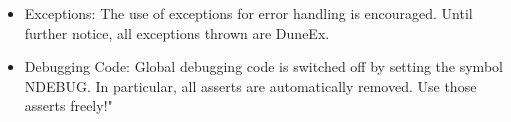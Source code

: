 \begin{itemize}
\begin{itemize}
\item Method Parameters
\item Template Parameters
\item Return Values
\item Exceptions thrown by a method
 \end{itemize}
     Since we all know that writing documentation is not well-liked and is frequently defered to some vague 
'next week', we herewith proclaim the Doc-Me Dogma . It goes like this: Whatever you do, and in whatever hurry you 
happen to be, please document everything at least with a {\verb /** $\backslash$todo Please doc me! */}. That way at least the absence 
of documentation is documented, and it is easier to get rid of it systematically.
\item Exceptions:
      The use of exceptions for error handling is encouraged. Until further notice, all exceptions thrown are DuneEx.
\item Debugging Code:
      Global debugging code is switched off by setting the symbol NDEBUG. In particular, all asserts are 
automatically removed. Use those asserts freely!" 
\end{itemize}
